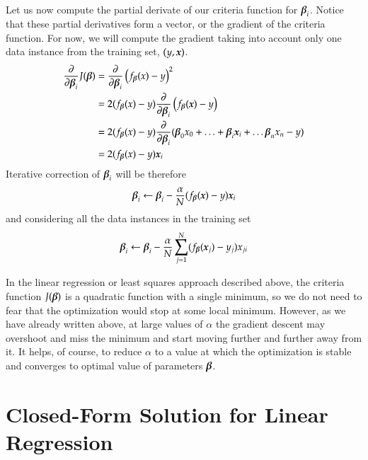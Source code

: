 \begin{refsection}
Let us now compute the partial derivate of our criteria function for $\boldsymbol{\beta}_i$. Notice that these partial derivatives form a vector, or the gradient of the criteria function. For now, we will compute the gradient taking into account only one data instance from the training set, $(y, \boldsymbol{x})$. 
%
\begin{align}
{\partial\over\partial\boldsymbol{\beta}_i} J(\boldsymbol{\beta}) & = 
{\partial\over\partial\boldsymbol{\beta}_i} \left(f_{\boldsymbol{\beta}}(x)-y\right)^2 \\
& = 2(f_{\boldsymbol{\beta}}(x)-y){\partial\over\partial\boldsymbol{\beta}_i}\left(f_{\boldsymbol{\beta}}(\boldsymbol{x})-y\right) \\
& = 2 (f_{\boldsymbol{\beta}}(x)-y){\partial\over\partial\boldsymbol{\beta}_i}(\boldsymbol{\beta}_0 x_0 + \ldots + \boldsymbol{\beta}_i \boldsymbol{x}_i + \ldots \boldsymbol{\beta}_n x_n - y) \\
& = 2 (f_{\boldsymbol{\beta}}(x)-y)\boldsymbol{x}_i
\end{align}
%
Iterative correction of $\boldsymbol{\beta}_i$ will be therefore
\begin{equation}
  \boldsymbol{\beta}_i\leftarrow\boldsymbol{\beta}_i-{\alpha\over N}(f_{\boldsymbol{\beta}}(\boldsymbol{x})-y) \boldsymbol{x}_i
\end{equation}
and considering all the data instances in the training set
\begin{equation}
  \boldsymbol{\beta}_i\leftarrow\boldsymbol{\beta}_i-{\alpha\over N}\sum_{j=1}^N(f_{\boldsymbol{\beta}}(\boldsymbol{x}_j)-y_j)x_{ji}
\end{equation}

In the linear regression or least squares approach described above, the criteria function $J(\boldsymbol{\beta})$ is a quadratic function with a single minimum, so we do not need to fear that the optimization would stop at some local minimum. However, as we have already written above, at large values of $\alpha$ the gradient descent may overshoot and miss the minimum and start moving further and further away from it. It helps, of course, to reduce $\alpha$ to a value at which the optimization is stable and converges to optimal value of parameters $\boldsymbol{\beta}$.

\section{Closed-Form Solution for Linear Regression}


\end{refsection}
